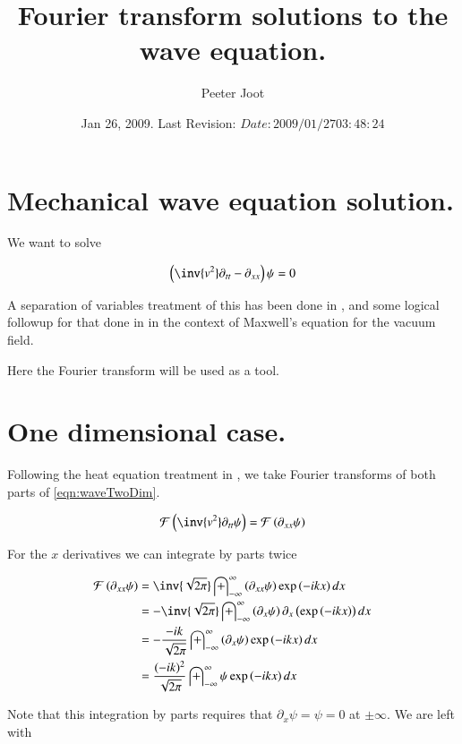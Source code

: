 \documentclass{article}
\title{ Fourier transform solutions to the wave equation. }
\author{Peeter Joot}
\date{ Jan 26, 2009.  Last Revision: $Date: 2009/01/27 03:48:24 $ }
\newcommand{\FF}[0]{\mathcal{F}}
\newcommand{\IIinf}[0]{ \int_{-\infty}^\infty }
\begin{document}
\maketitle{}

\section{ Mechanical wave equation solution. }

We want to solve

\begin{align}\label{eqn:waveTwoDim}
\left(\inv{v^2} \partial_{tt} - \partial_{xx}\right) \psi = 0
\end{align}

A separation of variables treatment of this has been done in
\cite{PJwaveFourVector}, and some logical followup for that done in
\cite{PJemWave} in the context of Maxwell's equation for the vacuum field.

Here the Fourier transform will be used as a tool.

\section{ One dimensional case. }

Following the heat equation treatment in \cite{PJheatFourier}, we take Fourier transforms 
of both parts of \ref{eqn:waveTwoDim}.

\begin{align*}
\FF\left( \inv{v^2} \partial_{tt} \psi \right) = \FF\left( \partial_{xx} \psi \right)
\end{align*}

For the $x$ derivatives we can integrate by parts twice

\begin{align*}
\FF\left( \partial_{xx} \psi \right)
&= \inv{\sqrt{2 \pi}} \IIinf \left( \partial_{xx} \psi \right) \exp\left( -i k x \right) dx \\
&= -\inv{\sqrt{2 \pi}} \IIinf \left( \partial_{x} \psi \right) \partial_x\left(\exp\left( -i k x \right) \right) dx \\
&= -\frac{-i k}{\sqrt{2 \pi}} \IIinf \left( \partial_{x} \psi \right) \exp\left( -i k x \right) dx \\
&= \frac{(-i k)^2}{\sqrt{2 \pi}} \IIinf \psi \exp\left( -i k x \right) dx \\
\end{align*}

Note that this integration by parts requires that $\partial_x \psi = \psi = 0$ at $\pm \infty$.  We are left with 
\end{document}
